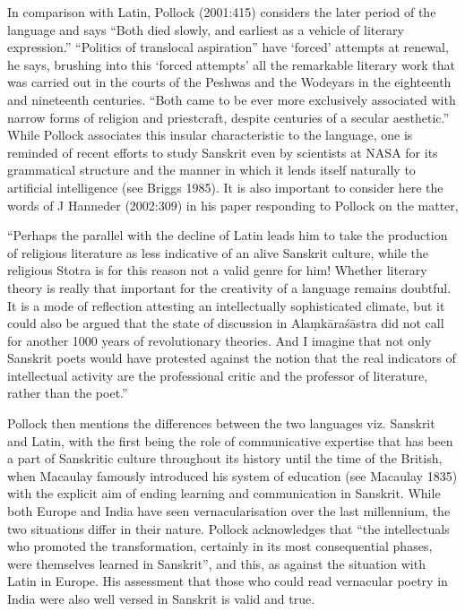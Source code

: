 In comparison with Latin, Pollock (2001:415) considers the later period of the language and says “Both died slowly, and earliest as a vehicle of literary expression.” “Politics of translocal aspiration” have ‘forced’ attempts at renewal, he says, brushing into this ‘forced attempts’ all the remarkable literary work that was carried out in the courts of the Peshwas and the Wodeyars in the eighteenth and nineteenth centuries. “Both came to be ever more exclusively associated with narrow forms of religion and priestcraft, despite centuries of a secular aesthetic.” While Pollock associates this insular characteristic to the language, one is reminded of recent efforts to study Sanskrit even by scientists at NASA for its grammatical structure and the manner in which it lends itself naturally to artificial intelligence (see Briggs 1985). It is also important to consider here the words of J Hanneder (2002:309) in his paper responding to Pollock on the matter, 

\begin{myquote}
“Perhaps the parallel with the decline of Latin leads him to take the production of religious literature as less indicative of an alive Sanskrit culture, while the religious Stotra is for this reason not a valid genre for him! Whether literary theory is really that important for the creativity of a language remains doubtful. It is a mode of reflection attesting an intellectually sophisticated climate, but it could also be argued that the state of discussion in Alaṃkāraśāstra did not call for another 1000 years of revolutionary theories. And I imagine that not only Sanskrit poets would have protested against the notion that the real indicators of intellectual activity are the professional critic and the professor of literature, rather than the poet.” 
\end{myquote}

Pollock then mentions the differences between the two languages viz. Sanskrit and Latin, with the first being the role of communicative expertise that has been a part of Sanskritic culture throughout its history until the time of the British, when Macaulay famously introduced his system of education (see Macaulay 1835) with the explicit aim of ending learning and communication in Sanskrit. While both Europe and India have seen vernacularisation over the last millennium, the two situations differ in their nature. Pollock acknowledges that “the intellectuals who promoted the transformation, certainly in its most consequential phases, were themselves learned in Sanskrit”, and this, as against the situation with Latin in Europe.  His assessment that those who could read vernacular poetry in India were also well versed in Sanskrit is valid and true. 

